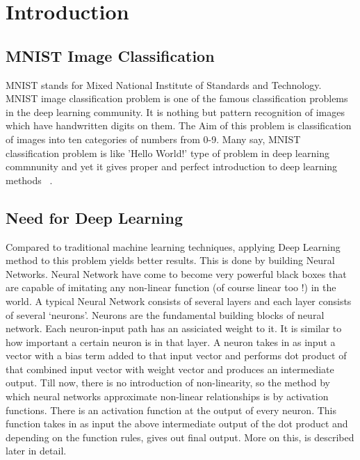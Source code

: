 

\maketitle



\section{Introduction}

\subsection{MNIST Image Classification}

MNIST stands for Mixed National Institute of Standards and Technology. MNIST
image classification problem is one of the famous classification problems in the
deep learning community. It is nothing but pattern recognition of images which
have handwritten digits on them. The Aim of this problem is classification of
images into ten categories of numbers from 0-9. Many say, MNIST classification
problem is like 'Hello World!' type of problem in deep learning commnunity and
yet it gives proper and perfect introduction to deep learning methods
~\cite{hid-sp18-401-mnist}.

\subsection{Need for Deep Learning}

Compared to traditional machine learning techniques, applying Deep Learning
method to this problem yields better results. This is done by building Neural
Networks. Neural Network have come to become very powerful black boxes that are
capable of imitating any non-linear function (of course linear too !) in the
world. A typical Neural Network consists of several layers and each layer
consists of several `neurons'. Neurons are the fundamental building blocks of
neural network.  Each neuron-input path has an assiciated weight to it. It is
similar to how important a certain neuron is in that layer. A neuron takes in as
input a vector with a bias term added to that input vector and performs dot
product of that combined input vector with weight vector and produces an
intermediate output. Till now, there is no introduction of non-linearity, so the
method by which neural networks approximate non-linear relationships is by
activation functions. There is an activation function at the output of every
neuron. This function takes in as input the above intermediate output of the dot
product and depending on the function rules, gives out final output. More on
this, is described later in detail.

